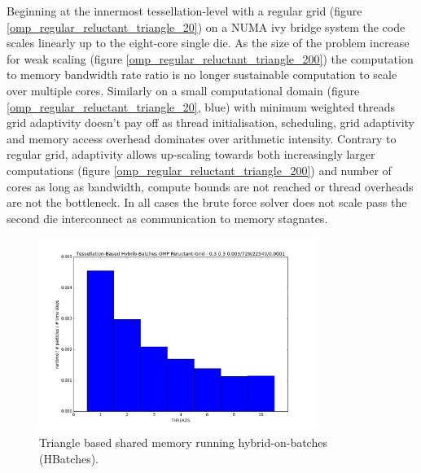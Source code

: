 Beginning at the innermost tessellation-level with a regular grid (figure \ref{omp_regular_reluctant_triangle_20}) on a NUMA ivy bridge system the code scales linearly up to the eight-core single die. As the size of the problem increase for weak scaling (figure \ref{omp_regular_reluctant_triangle_200}) the computation to memory bandwidth rate ratio is no longer sustainable computation to scale over multiple cores. Similarly on a small computational domain (figure \ref{omp_regular_reluctant_triangle_20}, blue) with minimum weighted threads grid adaptivity doesn't pay off as thread initialisation, scheduling, grid adaptivity and memory access overhead dominates over arithmetic intensity. Contrary to regular grid, adaptivity allows up-scaling towards both increasingly larger computations (figure \ref{omp_regular_reluctant_triangle_200}) and number of cores as long as bandwidth, compute bounds are not reached or thread overheads are not the bottleneck. In all cases the brute force solver does not scale pass the second die interconnect as communication to memory stagnates.

\begin{figure}[htb]
  \begin{center}
    \includegraphics[width=0.8\textwidth]{experiments/omp/hbatches_omp_triangles_200.png}
  \end{center}
  \caption{Triangle based shared memory running hybrid-on-batches (HBatches).}
  \label{figure:hbatches_triangles_triangle_omp}
\end{figure}

